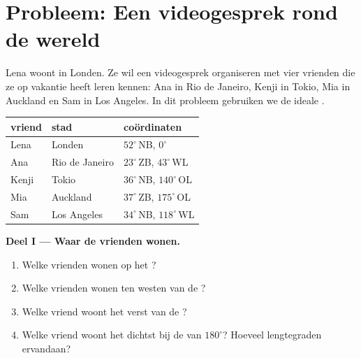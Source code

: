 \section{Probleem: Een videogesprek rond de wereld}

\begin{problem}
\label{pb:g6:latitude-longitude:1}
Lena woont in Londen. Ze wil een videogesprek organiseren met vier vrienden
die ze op vakantie heeft leren kennen: Ana in Rio de Janeiro, Kenji in
Tokio, Mia in Auckland en Sam in Los Angeles. In dit probleem gebruiken we
de ideale .

\begin{center}
\small
\begin{tabular}{lll}
\hline
vriend & stad & coördinaten\\
\hline
Lena & Londen & $52^\circ$\,NB, $0^\circ$\\
Ana & Rio de Janeiro & $23^\circ$\,ZB, $43^\circ$\,WL\\
Kenji & Tokio & $36^\circ$\,NB, $140^\circ$\,OL\\
Mia & Auckland & $37^\circ$\,ZB, $175^\circ$\,OL\\
Sam & Los Angeles & $34^\circ$\,NB, $118^\circ$\,WL\\
\hline
\end{tabular}
\end{center}

\medskip
\noindent\textbf{Deel I --- Waar de vrienden wonen.}
\begin{enumerate}
  \item Welke vrienden wonen op het ?
  \item Welke vrienden wonen ten westen van de ?
  \item Welke vriend woont het verst van de ?
  \item Welke vriend woont het dichtst bij de  van $180^\circ$?
        Hoeveel lengtegraden ervandaan?
\end{enumerate}


\end{problem}
